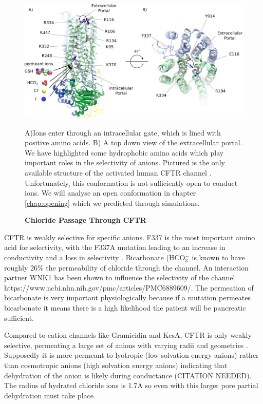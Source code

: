 \begin{figure}
	\begin{center}
	\includegraphics[width=\textwidth]{figures/chloride_passage_figure.pdf}
	\end{center}
	\label{chloride_passage}
	\captionsetup{singlelinecheck = false, justification=raggedright}
	\caption[Chlrodie Passage through CFTR] {\textbf{Chloride Passage Through CFTR}}{A)Ions enter through an intracellular gate, which is lined with positive amino acids. B) A top down view of the extracellular portal. We have highlighted some hydrophobic amino acids which play important roles in the selectivity of anions. Pictured is the only available structure of the activated human CFTR channel \cite{zhang2018}. Unfortunately, this conformation is not sufficiently open to conduct ions. We will analyse an open conformation in chapter \ref{chap:opening} which we predicted through simulations.} 

\end{figure}
CFTR is weakly selective for specific anions. F337 is the most important amino acid for selectivity, with the F337A mutation leading to an increase in conductivity and a loss in selectivity \cite{wei2016}. Bicarbonate (HCO$_3^-$ is known to have roughly 26\% the permeability of chloride through the channel. An interaction partner WNK1 has been shown to influence the selectivity of the channel https://www.ncbi.nlm.nih.gov/pmc/articles/PMC6889609/. The permeation of bicarbonate is very important physiologically because if a mutation permeates bicarbonate it means there is a high likelihood the patient will be pancreatic sufficient. 

Compared to cation channels like Gramicidin and KcsA, CFTR is only weakly selective, permeating a large set of anions with varying radii and geometries \cite{}. Supposedly it is more permeant to lyotropic (low solvation energy anions) rather than cosmotropic anions (high solvation energy anions) indicating that dehydration of the anion is likely during conductance (CITATION NEEDED). The radius of hydrated chloride ions is 1.7A \cite{yang2002} so even with this larger pore partial dehydration must take place. 

